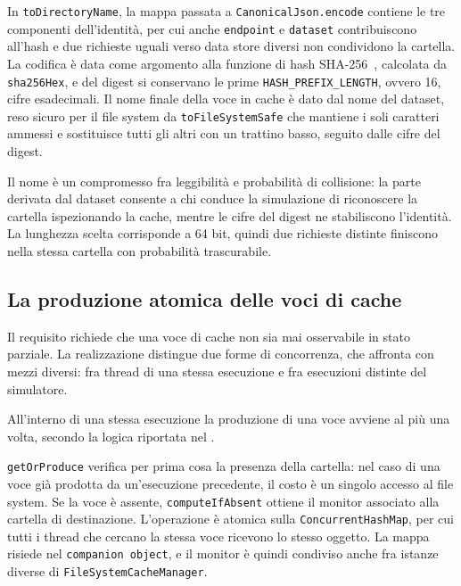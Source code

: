 

In \texttt{toDirectoryName}, la mappa passata a \texttt{CanonicalJson.encode} contiene le tre
componenti dell'identità, per cui anche \texttt{endpoint} e \texttt{dataset} contribuiscono
all'hash e due richieste uguali verso data store diversi non condividono la cartella. La
codifica è data come argomento alla funzione di hash SHA-256~\cite{sha256}, calcolata da
\texttt{sha256Hex}, e del digest si conservano le prime \texttt{HASH\_PREFIX\_LENGTH}, ovvero
16, cifre esadecimali. Il nome finale della voce in cache è dato dal nome del dataset,
reso sicuro per il file system da \texttt{toFileSystemSafe} che mantiene i soli caratteri ammessi
e sostituisce tutti gli altri con un trattino basso, seguito dalle cifre del digest.
 
Il nome è un compromesso fra leggibilità e probabilità di collisione: la parte derivata dal
dataset consente a chi conduce la simulazione di riconoscere la cartella ispezionando la
cache, mentre le cifre del digest ne stabiliscono l'identità. La lunghezza scelta corrisponde
a 64 bit, quindi due richieste distinte finiscono nella stessa cartella con probabilità
trascurabile.

\subsection{La produzione atomica delle voci di cache}
\label{subsec:atomicita-impl}

Il requisito  richiede che una voce di cache non sia mai osservabile in stato
parziale. La realizzazione distingue due forme di concorrenza, che affronta con mezzi
diversi: fra thread di una stessa esecuzione e fra esecuzioni distinte del simulatore.

All'interno di una stessa esecuzione la produzione di una voce avviene al più una volta,
secondo la logica riportata nel .



\texttt{getOrProduce} verifica per prima cosa la presenza della cartella:
nel caso di una voce già prodotta da un'esecuzione
precedente, il costo è un singolo accesso al file system. Se la voce è assente,
\texttt{computeIfAbsent} ottiene il monitor associato alla cartella di destinazione.
L'operazione è atomica sulla \texttt{ConcurrentHashMap}, per cui tutti i thread che cercano
la stessa voce ricevono lo stesso oggetto. La mappa risiede nel \texttt{companion object},
e il monitor è quindi condiviso anche fra istanze diverse di
\texttt{FileSystemCacheManager}.

